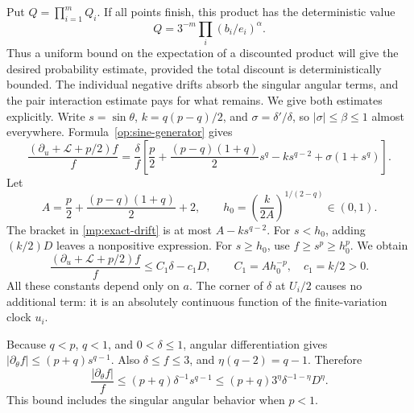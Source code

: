 Put $Q=\prod_{i=1}^m Q_i$. If all points finish, this product has
the deterministic value
\[
 Q=3^{-m}\prod_i(b_i/e_i)^\alpha.
\]
Thus a uniform bound on the expectation of a discounted product will
give the desired probability estimate, provided the total discount is
deterministically bounded. The individual negative drifts absorb
the singular angular terms, and the pair interaction estimate pays for
what remains. We give both estimates explicitly. Write
$s=\sin\theta$, $k=q(p-q)/2$, and $\sigma=\delta'/\delta$, so
$|\sigma|\le\beta\le1$ almost everywhere. Formula~\eqref{op:sine-generator}
gives
\begin{equation}
 \frac{(\partial_u+\mathcal L+p/2)f}{f}
 =\frac\delta f\left[
 \frac p2+\frac{(p-q)(1+q)}2s^q-ks^{q-2}
                         +\sigma(1+s^q)\right].
 \label{mp:exact-drift}
\end{equation}
Let
\[
 A=\frac p2+\frac{(p-q)(1+q)}2+2,
 \qquad h_0=\left(\frac{k}{2A}\right)^{1/(2-q)}\in(0,1).
\]
The bracket in \eqref{mp:exact-drift} is at most $A-ks^{q-2}$.
For $s<h_0$, adding $(k/2)D$ leaves a nonpositive expression.
For $s\ge h_0$, use $f\ge s^p\ge h_0^p$. We obtain
\begin{equation}
 \frac{(\partial_u+\mathcal L+p/2)f}{f}
 \le C_1\delta-c_1D,
 \qquad C_1=Ah_0^{-p},\quad c_1=k/2>0.
 \label{mp:drift-bound}
\end{equation}
All these constants depend only on $a$. The corner of $\delta$ at
$U_i/2$ causes no additional term: it is an absolutely continuous
function of the finite-variation clock $u_i$.

Because $q<p$, $q<1$, and $0<\delta\le1$, angular differentiation
gives $|\partial_\theta f|\le(p+q)s^{q-1}$. Also $\delta\le f\le3$,
and $\eta(q-2)=q-1$. Therefore
\begin{equation}
 \frac{|\partial_\theta f|}{f}
 \le(p+q)\delta^{-1}s^{q-1}
 \le(p+q)3^\eta\delta^{-1-\eta}D^\eta.
 \label{mp:derivative-bound}
\end{equation}
This bound includes the singular angular behavior when $p<1$.

